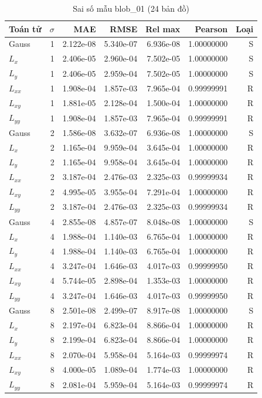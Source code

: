 \begin{table}[p]
\centering
\caption{Sai số mẫu blob\_01 (24 bản đồ)}
\begin{tabular}{lrrrrrr}
\toprule
Toán tử & $\sigma$ & MAE & RMSE & Rel max & Pearson & Loại\\
\midrule
Gauss & 1 & 2.122e-08 & 5.340e-07 & 6.936e-08 & 1.00000000 & S \\
$L_x$ & 1 & 2.406e-05 & 2.960e-04 & 7.502e-05 & 1.00000000 & S \\
$L_y$ & 1 & 2.406e-05 & 2.959e-04 & 7.502e-05 & 1.00000000 & S \\
$L_{xx}$ & 1 & 1.908e-04 & 1.857e-03 & 7.965e-04 & 0.99999991 & R \\
$L_{xy}$ & 1 & 1.881e-05 & 2.128e-04 & 1.500e-04 & 1.00000000 & R \\
$L_{yy}$ & 1 & 1.908e-04 & 1.857e-03 & 7.965e-04 & 0.99999991 & R \\
Gauss & 2 & 1.586e-08 & 3.632e-07 & 6.936e-08 & 1.00000000 & S \\
$L_x$ & 2 & 1.165e-04 & 9.959e-04 & 3.645e-04 & 1.00000000 & R \\
$L_y$ & 2 & 1.165e-04 & 9.958e-04 & 3.645e-04 & 1.00000000 & R \\
$L_{xx}$ & 2 & 3.187e-04 & 2.476e-03 & 2.325e-03 & 0.99999934 & R \\
$L_{xy}$ & 2 & 4.995e-05 & 3.955e-04 & 7.291e-04 & 1.00000000 & R \\
$L_{yy}$ & 2 & 3.187e-04 & 2.476e-03 & 2.325e-03 & 0.99999934 & R \\
Gauss & 4 & 2.855e-08 & 4.857e-07 & 8.048e-08 & 1.00000000 & S \\
$L_x$ & 4 & 1.988e-04 & 1.140e-03 & 6.765e-04 & 1.00000000 & R \\
$L_y$ & 4 & 1.988e-04 & 1.140e-03 & 6.765e-04 & 1.00000000 & R \\
$L_{xx}$ & 4 & 3.247e-04 & 1.646e-03 & 4.017e-03 & 0.99999950 & R \\
$L_{xy}$ & 4 & 5.744e-05 & 2.898e-04 & 1.353e-03 & 1.00000000 & R \\
$L_{yy}$ & 4 & 3.247e-04 & 1.646e-03 & 4.017e-03 & 0.99999950 & R \\
Gauss & 8 & 2.501e-08 & 2.499e-07 & 8.917e-08 & 1.00000000 & S \\
$L_x$ & 8 & 2.197e-04 & 6.823e-04 & 8.866e-04 & 1.00000000 & R \\
$L_y$ & 8 & 2.199e-04 & 6.823e-04 & 8.866e-04 & 1.00000000 & R \\
$L_{xx}$ & 8 & 2.070e-04 & 5.958e-04 & 5.164e-03 & 0.99999974 & R \\
$L_{xy}$ & 8 & 4.000e-05 & 1.089e-04 & 1.774e-03 & 1.00000000 & R \\
$L_{yy}$ & 8 & 2.081e-04 & 5.959e-04 & 5.164e-03 & 0.99999974 & R \\
\bottomrule
\end{tabular}
\end{table}

